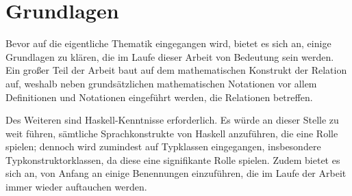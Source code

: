 \section{Grundlagen}

\label{sec:grundlagen}

Bevor auf die eigentliche Thematik eingegangen wird, bietet es sich an, einige Grundlagen zu klären, die im Laufe dieser Arbeit
von Bedeutung sein werden. Ein großer Teil der Arbeit baut auf dem mathematischen Konstrukt der Relation auf, weshalb neben
grundsätzlichen mathematischen Notationen vor allem Definitionen und Notationen eingeführt werden, die Relationen betreffen.

Des Weiteren sind Haskell-Kenntnisse erforderlich. Es würde an dieser Stelle zu weit führen, sämtliche Sprachkonstrukte von
Haskell anzuführen, die eine Rolle spielen; dennoch wird zumindest auf Typklassen eingegangen, insbesondere Typkonstruktorklassen,
da diese eine signifikante Rolle spielen. Zudem bietet es sich an, von Anfang an einige Benennungen einzuführen, die im Laufe der
Arbeit immer wieder auftauchen werden.





